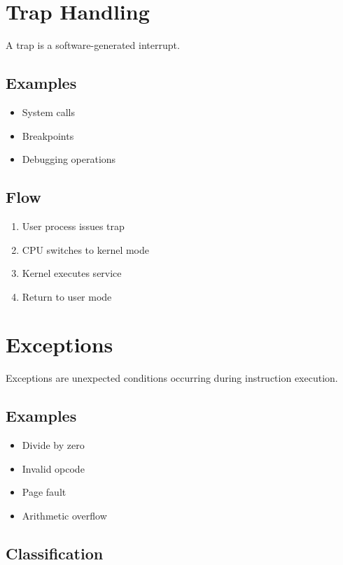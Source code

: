 \section{Trap Handling}

A trap is a software-generated interrupt.

\subsection{Examples}

\begin{itemize}
\item System calls
\item Breakpoints
\item Debugging operations
\end{itemize}

\subsection{Flow}

\begin{enumerate}
\item User process issues trap
\item CPU switches to kernel mode
\item Kernel executes service
\item Return to user mode
\end{enumerate}

\section{Exceptions}

Exceptions are unexpected conditions occurring during instruction execution.

\subsection{Examples}

\begin{itemize}
\item Divide by zero
\item Invalid opcode
\item Page fault
\item Arithmetic overflow
\end{itemize}

\subsection{Classification}

